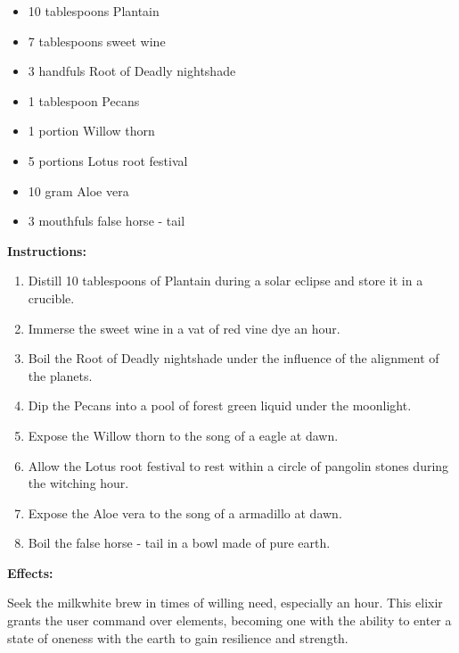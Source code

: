 \documentclass{article}
\begin{document}
\begin{itemize}
  \item 10 tablespoons Plantain
  \item 7 tablespoons sweet wine
  \item 3 handfuls Root of Deadly nightshade
  \item 1 tablespoon Pecans
  \item 1 portion Willow thorn
  \item 5 portions Lotus root festival
  \item 10 gram Aloe vera
  \item 3 mouthfuls false horse - tail
\end{itemize}

\textbf{Instructions:}

\begin{enumerate}
  \item Distill 10 tablespoons of Plantain during a solar eclipse and store it in a crucible.
  \item Immerse the sweet wine in a vat of red vine dye an hour.
  \item Boil the Root of Deadly nightshade under the influence of the alignment of the planets.
  \item Dip the Pecans into a pool of forest green liquid under the moonlight.
  \item Expose the Willow thorn to the song of a eagle at dawn.
  \item Allow the Lotus root festival to rest within a circle of pangolin stones during the witching hour.
  \item Expose the Aloe vera to the song of a armadillo at dawn.
  \item Boil the false horse - tail in a bowl made of pure earth.
\end{enumerate}

\textbf{Effects:}

Seek the milkwhite brew in times of willing need, especially an hour. This elixir grants the user command over elements, becoming one with the ability to enter a state of oneness with the earth to gain resilience and strength.
\end{document}
